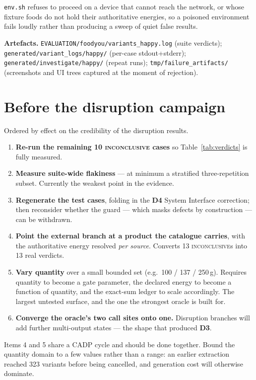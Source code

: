 \documentclass[11pt,a4paper]{article}
\newcommand{\dref}[1]{\textbf{D#1}}
\begin{document}
\noindent\texttt{env.sh} refuses to proceed on a device that cannot reach the
network, or whose fixture foods do not hold their authoritative energies, so a
poisoned environment fails loudly rather than producing a sweep of quiet false
results.

\medskip
\noindent\textbf{Artefacts.}
\texttt{EVALUATION/foodyou/variants\_happy.log} (suite verdicts);
\texttt{generated/variant\_logs/happy/} (per-case stdout+stderr);
\texttt{generated/investigate/happy/} (repeat runs);
\texttt{tmp/failure\_artifacts/} (screenshots and UI trees captured at the moment of
rejection).

\section{Before the disruption campaign}

Ordered by effect on the credibility of the disruption results.

\begin{enumerate}\setlength\itemsep{2pt}
  \item \textbf{Re-run the remaining 10 \textsc{inconclusive} cases} so
  Table~\ref{tab:verdicts} is fully measured.
  \item \textbf{Measure suite-wide flakiness} --- at minimum a stratified
  three-repetition subset. Currently the weakest point in the evidence.
  \item \textbf{Regenerate the test cases}, folding in the \dref{4} System
  Interface correction; then reconsider whether the guard --- which masks defects
  by construction --- can be withdrawn.
  \item \textbf{Point the external branch at a product the catalogue carries}, with
  the authoritative energy resolved \emph{per source}. Converts 13
  \textsc{inconclusive}s into 13 real verdicts.
  \item \textbf{Vary quantity} over a small bounded set (e.g.\ 100 / 137 / 250\,g).
  Requires quantity to become a gate parameter, the declared energy to become a
  function of quantity, and the exact-sum ledger to scale accordingly. The largest
  untested surface, and the one the strongest oracle is built for.
  \item \textbf{Converge the oracle's two call sites onto one.} Disruption branches
  will add further multi-output states --- the shape that produced \dref{3}.
\end{enumerate}

\noindent Items 4 and 5 share a CADP cycle and should be done together. Bound the
quantity domain to a few values rather than a range: an earlier extraction reached
323 variants before being cancelled, and generation cost will otherwise dominate.
\end{document}
